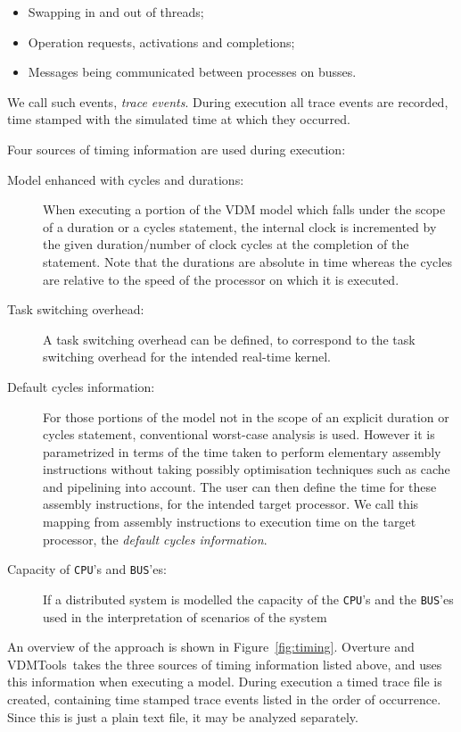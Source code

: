 \documentclass{overturerepchap}
\newcommand{\vdmtools}{VDMTools}
\begin{document}
\begin{itemize}
\item Swapping in and out of threads;
\item Operation requests, activations and completions;
\item Messages being communicated between processes on busses.
\end{itemize}

We call such events, \emph{trace events}. During execution all trace
events are recorded, time stamped with the simulated time at which
they occurred.

Four sources of timing information are used during execution:

\begin{description}
\item[Model enhanced with cycles and durations:] When executing a 
portion of the VDM model which falls under the scope of a duration
or a cycles statement, the internal clock is incremented by the given
duration/number of clock cycles at the completion of the
statement. Note that the durations are absolute in time whereas the
cycles are relative to the speed of the processor on which it is
executed.
\item[Task switching overhead:] A task switching overhead can be
defined, to correspond to the task switching overhead for the intended
real-time kernel.
\item[Default cycles information:] For those portions of the model
not in the scope of an explicit duration or cycles statement, conventional worst-case
analysis is used. However it is parametrized in terms of the time
taken to perform elementary assembly instructions without taking
possibly optimisation techniques such as cache and pipelining into
account. The user can then define the time for these assembly
instructions, for the intended target processor. We call this mapping
from assembly instructions to execution time on the target processor,
the \emph{default cycles information}.
\item[Capacity of \texttt{CPU}'s and \texttt{BUS}'es:] If a distributed system is modelled
the capacity of the \texttt{CPU}'s and the \texttt{BUS}'es used in the
interpretation of scenarios of the system
\end{description}

An overview of the approach is shown in
Figure~\ref{fig:timing}. Overture and \vdmtools\
takes the three sources of timing information
listed above, and uses this information when executing a model. During
execution a timed trace file is created, containing time stamped trace
events listed in the order of occurrence. Since this is just a plain
text file, it may be analyzed separately.
\end{document}
